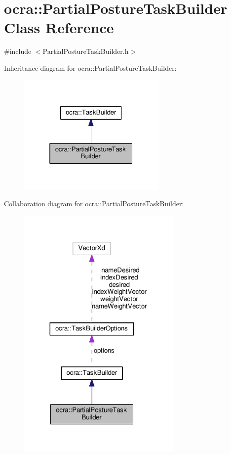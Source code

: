 \hypertarget{classocra_1_1PartialPostureTaskBuilder}{}\section{ocra\+:\+:Partial\+Posture\+Task\+Builder Class Reference}
\label{classocra_1_1PartialPostureTaskBuilder}


{\ttfamily \#include $<$Partial\+Posture\+Task\+Builder.\+h$>$}



Inheritance diagram for ocra\+:\+:Partial\+Posture\+Task\+Builder\+:
\nopagebreak
\begin{figure}[H]
\begin{center}
\leavevmode
\includegraphics[width=205pt]{d1/d8b/classocra_1_1PartialPostureTaskBuilder__inherit__graph}
\end{center}
\end{figure}


Collaboration diagram for ocra\+:\+:Partial\+Posture\+Task\+Builder\+:
\nopagebreak
\begin{figure}[H]
\begin{center}
\leavevmode
\includegraphics[width=228pt]{d6/d95/classocra_1_1PartialPostureTaskBuilder__coll__graph}
\end{center}
\end{figure}
